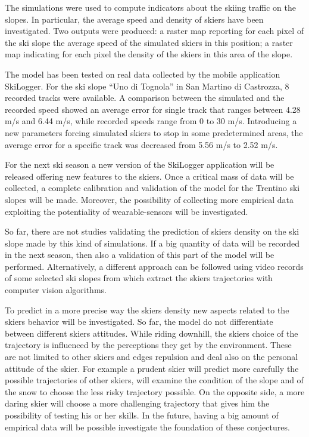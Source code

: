 \documentclass[12pt,a4paper,twoside]{book}
\begin{document}
The simulations were used to compute indicators about the skiing traffic on the slopes. In particular, the average speed and density of skiers have been investigated. Two outputs were produced: a raster map reporting for each pixel of the ski slope the average speed of the simulated skiers in this position; a raster map indicating for each pixel the density of the skiers in this area of the slope.

The model has been tested on real data collected by the mobile application SkiLogger. For the ski slope ``Uno di Tognola'' in San Martino di Castrozza, 8 recorded tracks were available. A comparison between the simulated and the recorded speed showed an average error for single track that ranges between 4.28 m/s and 6.44 m/s, while recorded speeds range from 0 to 30 m/s. Introducing a new parameters forcing simulated skiers to stop in some predetermined areas, the average error for a specific track was decreased from 5.56 m/s to 2.52 m/s.

For the next ski season a new version of the SkiLogger application will be released offering new features to the skiers. Once a critical mass of data will be collected, a complete calibration and validation of the model for the Trentino ski slopes will be made. Moreover, the possibility of collecting more empirical data exploiting the potentiality of wearable-sensors will be investigated.

So far, there are not studies validating the prediction of skiers density on the ski slope made by this kind of simulations. If a big quantity of data will be recorded in the next season, then also a validation of this part of the model will be performed. Alternatively, a different approach can be followed using video records of some selected ski slopes from which extract the skiers trajectories with computer vision algorithms.

To predict in a more precise way the skiers density new aspects related to the skiers behavior will be investigated. So far, the model do not differentiate between different skiers attitudes. While riding downhill, the skiers choice of the trajectory is influenced by the perceptions they get by the environment. These are not limited to other skiers and edges repulsion and deal also on the personal attitude of the skier. For example a prudent skier will predict more carefully the possible trajectories of other skiers, will examine the condition of the slope and of the snow to choose the less risky trajectory possible. On the opposite side, a more daring skier will choose a more challenging trajectory that gives him the possibility of testing his or her skills. In the future, having a big amount of empirical data will be possible investigate the foundation of these conjectures.


\end{document}
